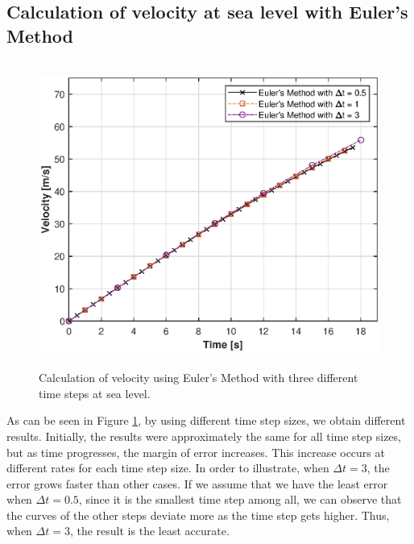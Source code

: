 \documentclass[letterpaper,12pt]{article}
\begin{document}
\subsection{Calculation of velocity at sea level with Euler's Method }
\begin{figure}[ht]
\centering \includegraphics[max height=10cm]{graphs/question1.eps}
\caption{Calculation of velocity using Euler's Method with three different time steps at sea level.}
     \label{fig:q1}
\end{figure}

As can be seen in Figure \ref{fig:q1}, by using different time step sizes, we obtain different results.
Initially, the results were approximately the same for all time step sizes, but as time progresses, the margin of error increases.
This increase occurs at different rates for each time step size. In order to illustrate, when $ \Delta t = 3 $, the
error grows faster than other cases. If we assume that we have the least error when $ \Delta t = 0.5 $, since it is
the smallest time step among all, we can observe that the curves of the other steps deviate more as the time step gets
higher. Thus, when $ \Delta t = 3 $, the result is the least accurate.
\end{document}
